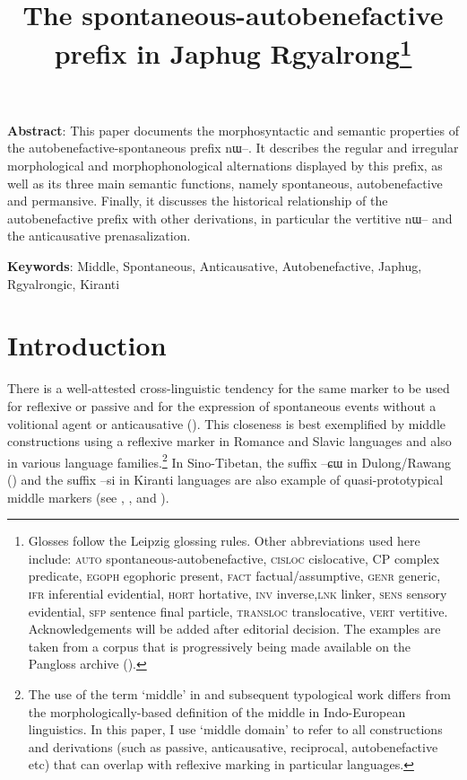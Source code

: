 \documentclass[oldfontcommands,oneside,a4paper,11pt]{article}
\newcommand{\ipa}[1]{{\phon \mbox{#1}}} %
\begin{document}
 
 \title{The spontaneous-autobenefactive prefix in Japhug Rgyalrong\footnote{Glosses follow the Leipzig glossing rules. Other abbreviations used here include: \textsc{auto} spontaneous-autobenefactive, \textsc{cisloc} cislocative, CP complex predicate, \textsc{egoph} egophoric present,  \textsc{fact} factual/assumptive, \textsc{genr} generic, \textsc{ifr} inferential evidential, \textsc{hort} hortative, \textsc{inv} inverse,\textsc{lnk} linker, \textsc{sens} sensory  evidential, \textsc{sfp} sentence final particle, \textsc{transloc} translocative, \textsc{vert} vertitive.  Acknowledgements will be added after editorial decision. The examples are taken from a corpus that is progressively being made available on the Pangloss archive (\citealt{michailovsky14pangloss}). }}
\maketitle
\linenumbers
\sloppy

\textbf{Abstract}: This paper documents the morphosyntactic and semantic properties of the autobenefactive-spontaneous prefix \ipa{nɯ--}. It describes the regular and irregular morphological and morphophonological alternations displayed by this prefix, as well as its three main semantic functions, namely spontaneous, autobenefactive and permansive. Finally, it discusses the historical relationship of the autobenefactive prefix with other derivations, in particular the vertitive \ipa{nɯ--} and the anticausative prenasalization.

\textbf{Keywords}: Middle, Spontaneous, Anticausative, Autobenefactive, Japhug, Rgyalrongic, Kiranti


\section{Introduction}
There is a well-attested cross-linguistic tendency for the same marker to be used for reflexive or passive and for the expression of spontaneous events without a volitional agent or anticausative (\citealt[142-144]{kemmer93middle}). This closeness is best exemplified by middle constructions using a reflexive marker  in Romance and Slavic languages and also in various language families.\footnote{The use of the term `middle' in \citet{kemmer93middle}  and subsequent typological work differs from the morphologically-based definition of the middle in Indo-European linguistics.    In this paper, I use `middle domain' to refer to all constructions and derivations (such as passive, anticausative, reciprocal, autobenefactive etc) that can overlap with reflexive marking in particular languages. } In Sino-Tibetan, the suffix \ipa{--ɕɯ}  in Dulong/Rawang (\citealt{lapolla05reflexive}) and the suffix \ipa{--si}  in Kiranti languages are also example of quasi-prototypical middle markers (see \citealt[144-146]{michailovsky88}, \citealt[125-129]{driem93dumi}, \citealt[260-263]{opgenort04wambule} and \citealt[398]{bickel10ditransitive}).
\end{document}

